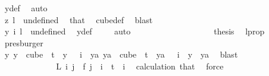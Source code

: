 \begin{isabellebody}
\ y{\isacharunderscore}{\kern0pt}def\ \isamarkupfalse%
\ auto\isanewline
\ \ \ \ \ \ \ \ \ \ \ \ \ \ \isamarkupfalse%
\isanewline
\ \ \ \ \ \ \ \ \ \ \ \ \ \ \ \ \isamarkupfalse%
\ {}\isanewline
\ \ \ \ \ \ \ \ \ \ \ \ \ \ \ \ \isamarkupfalse%
\ \isamarkupfalse%
\ {\isachardoublequoteopen}z\ l\ {\isacharequal}{\kern0pt}\ undefined{\isachardoublequoteclose}\ \isamarkupfalse%
\ that\ \isamarkupfalse%
\ cube{\isacharunderscore}{\kern0pt}def\ \isamarkupfalse%
\ blast\isanewline
\ \ \ \ \ \ \ \ \ \ \ \ \ \ \ \ \isamarkupfalse%
\ \isamarkupfalse%
\ {\isachardoublequoteopen}y\ i\ l\ {\isacharequal}{\kern0pt}\ undefined{\isachardoublequoteclose}\ \isamarkupfalse%
\ y{\isacharunderscore}{\kern0pt}def\ \isamarkupfalse%
\ {}\ \isamarkupfalse%
\ auto\isanewline
\ \ \ \ \ \ \ \ \ \ \ \ \ \ \ \ \isamarkupfalse%
\ \isamarkupfalse%
\ {\isacharquery}{\kern0pt}thesis\ \isamarkupfalse%
\ l{\isacharunderscore}{\kern0pt}prop\ \isamarkupfalse%
\ presburger\isanewline
\ \ \ \ \ \ \ \ \ \ \ \ \ \ \isamarkupfalse%
\isanewline
\ \ \ \ \ \ \ \ \ \ \ \ \isamarkupfalse%
\isanewline
\ \ \ \ \ \ \ \ \ \ \ \ \isamarkupfalse%
\ \isamarkupfalse%
\ {\isachardoublequoteopen}{\isasymexists}y{\isachardot}{\kern0pt}\ {\isacharparenleft}{\kern0pt}y\ {\isasymin}\ cube\ {}\ t\ {\isasymand}\ y\ {}\ {\isacharequal}{\kern0pt}\ i{\isacharparenright}{\kern0pt}\ {\isasymand}\ {\isacharparenleft}{\kern0pt}{\isasymforall}ya{\isachardot}{\kern0pt}\ ya\ {\isasymin}\ cube\ {}\ t\ {\isasymand}\ ya\ {}\ {\isacharequal}{\kern0pt}\ i\ {\isasymlongrightarrow}\ y\ {\isacharequal}{\kern0pt}\ ya{\isacharparenright}{\kern0pt}{\isachardoublequoteclose}\ \isamarkupfalse%
\ blast\isanewline
\isanewline
\ \ \ \ \ \ \ \ \ \ \isamarkupfalse%
\isanewline
\ \ \ \ \ \ \ \ \ \ \isamarkupfalse%
\ \isamarkupfalse%
\ {\isachardoublequoteopen}L\ i\ j\ {\isacharequal}{\kern0pt}\ f\ j{\isachardoublequoteclose}\ \ {\isachardoublequoteopen}i\ {\isacharless}{\kern0pt}\ t{\isachardoublequoteclose}\ \ i\ \isamarkupfalse%
\ calculation\ that\ \isamarkupfalse%
\ force\isanewline

\end{isabellebody}
